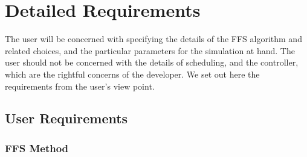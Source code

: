 \documentclass[11pt]{article}
\begin{document}
\section{Detailed Requirements}

The user will be concerned with specifying the details of the FFS
algorithm and related choices, and the particular parameters for
the simulation at hand. The user should not be concerned with the
details of scheduling, and the controller, which are the rightful
concerns of the developer. We set out here the requirements from
the user's view point.

\subsection{User Requirements}

\subsubsection{FFS Method}
\end{document}
